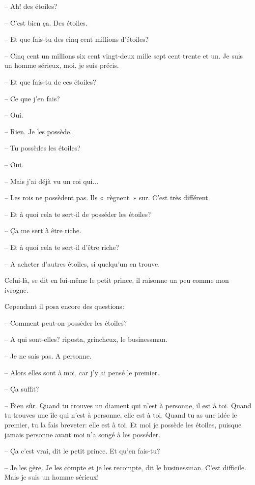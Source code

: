 \documentclass[a4paper]{report}
\begin{document}
-- Ah! des étoiles?

-- C'est bien ça. Des étoiles.

-- Et que fais-tu des cinq cent millions d'étoiles?

-- Cinq cent un millions six cent vingt-deux mille sept cent trente et un. Je suis un homme sérieux, moi, je suis précis.

-- Et que fais-tu de ces étoiles?

-- Ce que j'en fais?

-- Oui.

-- Rien. Je les possède.

-- Tu possèdes les étoiles?

-- Oui.

-- Mais j'ai déjà vu un roi qui...

-- Les rois ne possèdent pas. Ils «~règnent~» sur. C'est très différent.

-- Et à quoi cela te sert-il de posséder les étoiles?

-- Ça me sert à être riche.

-- Et à quoi cela te sert-il d'être riche?

-- A acheter d'autres étoiles, si quelqu'un en trouve.

Celui-là, se dit en lui-même le petit prince, il raisonne un peu comme mon ivrogne.

Cependant il posa encore des questions:

-- Comment peut-on posséder les étoiles?

-- A qui sont-elles? riposta, grincheux, le businessman.

-- Je ne sais pas. A personne.

-- Alors elles sont à moi, car j'y ai pensé le premier.

-- Ça suffit?

-- Bien sûr. Quand tu trouves un diament qui n'est à personne, il est à toi. Quand tu trouves une île qui n'est à personne, elle est à toi. Quand tu as une idée le premier, tu la fais breveter: elle est à toi. Et moi je possède les étoiles, puisque jamais personne avant moi n'a songé à les posséder.

-- Ça c'est vrai, dit le petit prince. Et qu'en fais-tu?

-- Je les gère. Je les compte et je les recompte, dit le businessman. C'est difficile. Mais je suis un homme sérieux!
\end{document}
